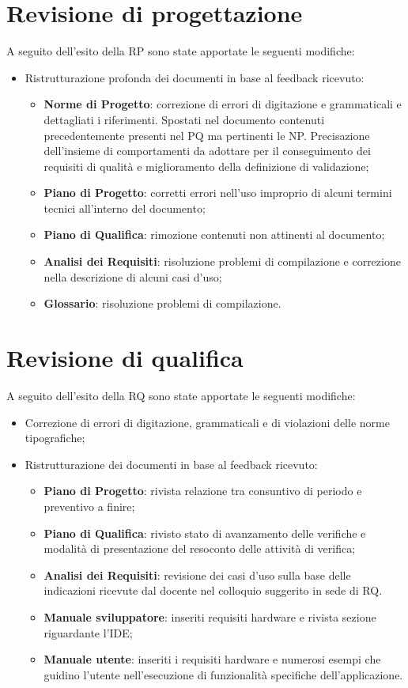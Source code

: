 \documentclass[openany,12pt,a4paper]{report}
\begin{document}
\section{Revisione di progettazione}

A seguito dell'esito della RP sono state apportate le seguenti modifiche:

\begin{itemize}
	\item Ristrutturazione profonda dei documenti in base al feedback ricevuto:
	\begin{itemize}
		\item \textbf{Norme di Progetto}: correzione di errori di digitazione e grammaticali e dettagliati i riferimenti. Spostati nel documento contenuti precedentemente presenti nel PQ ma pertinenti le NP. Precisazione dell'insieme di comportamenti da adottare per il conseguimento dei requisiti di qualità e miglioramento della definizione di validazione;
		\item \textbf{Piano di Progetto}: corretti errori nell'uso improprio di alcuni termini tecnici all'interno del documento;
		\item \textbf{Piano di Qualifica}: rimozione contenuti non attinenti al documento;
		\item \textbf{Analisi dei Requisiti}: risoluzione problemi di compilazione e correzione nella descrizione di alcuni casi d'uso;
		\item \textbf{Glossario}: risoluzione problemi di compilazione.
	\end{itemize}
\end{itemize}

\section{Revisione di qualifica}

A seguito dell'esito della RQ sono state apportate le seguenti modifiche:

\begin{itemize}
	\item Correzione di errori di digitazione, grammaticali e di violazioni delle norme tipografiche;
	\item Ristrutturazione dei documenti in base al feedback ricevuto:
	\begin{itemize}
		\item \textbf{Piano di Progetto}: rivista relazione tra consuntivo di periodo e preventivo a finire;
		\item \textbf{Piano di Qualifica}: rivisto stato di avanzamento delle verifiche e modalità di presentazione del resoconto delle attività di verifica;
		\item \textbf{Analisi dei Requisiti}: revisione dei casi d'uso sulla base delle indicazioni ricevute dal docente nel colloquio suggerito in sede di RQ.
		\item \textbf{Manuale sviluppatore}: inseriti requisiti hardware e rivista sezione riguardante l'IDE;
		\item \textbf{Manuale utente}: inseriti i requisiti hardware e numerosi esempi che guidino l'utente nell'esecuzione di funzionalità specifiche dell'applicazione. 
	\end{itemize}
\end{itemize}
\end{document}
